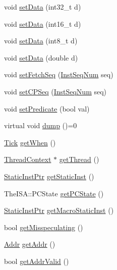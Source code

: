 \begin{DoxyCompactItemize}
\item 
void \hyperlink{classTrace_1_1InstRecord_a0a9235e734de679667de04c586e8f5b8}{setData} (int32\_\-t d)
\item 
void \hyperlink{classTrace_1_1InstRecord_ad6c5a6b94b9bcb41af8fbf69bd96dd75}{setData} (int16\_\-t d)
\item 
void \hyperlink{classTrace_1_1InstRecord_a0028137d8603f477e28f9869f9617937}{setData} (int8\_\-t d)
\item 
void \hyperlink{classTrace_1_1InstRecord_a2abd4d7259938c86cfd9bd95f55f1c9f}{setData} (double d)
\item 
void \hyperlink{classTrace_1_1InstRecord_a6a2a2c4c9142ba6924aff9399759ad32}{setFetchSeq} (\hyperlink{inst__seq_8hh_a258d93d98edaedee089435c19ea2ea2e}{InstSeqNum} seq)
\item 
void \hyperlink{classTrace_1_1InstRecord_a6509e37b7ec23ed19556f37f235d8590}{setCPSeq} (\hyperlink{inst__seq_8hh_a258d93d98edaedee089435c19ea2ea2e}{InstSeqNum} seq)
\item 
void \hyperlink{classTrace_1_1InstRecord_a137a8c6cced89c2ff8387900439436b4}{setPredicate} (bool val)
\item 
virtual void \hyperlink{classTrace_1_1InstRecord_abf1ad25f5e8a680b74ae28575b1f0539}{dump} ()=0
\item 
\hyperlink{base_2types_8hh_a5c8ed81b7d238c9083e1037ba6d61643}{Tick} \hyperlink{classTrace_1_1InstRecord_ad59bd82868f55bde1edb9cee2949d267}{getWhen} ()
\item 
\hyperlink{classThreadContext}{ThreadContext} $\ast$ \hyperlink{classTrace_1_1InstRecord_a811dcdeb8c7f7311f203ae83a0619a72}{getThread} ()
\item 
\hyperlink{classRefCountingPtr}{StaticInstPtr} \hyperlink{classTrace_1_1InstRecord_aa6c3d79c9aefcdce933e5fb3a075a2c8}{getStaticInst} ()
\item 
TheISA::PCState \hyperlink{classTrace_1_1InstRecord_aff4d31108c216c0c9f134e019d6e2174}{getPCState} ()
\item 
\hyperlink{classRefCountingPtr}{StaticInstPtr} \hyperlink{classTrace_1_1InstRecord_a083f29286a8611d917cadee93a84cb04}{getMacroStaticInst} ()
\item 
bool \hyperlink{classTrace_1_1InstRecord_a40be5892297a4e4a3056c358fd8d9a64}{getMisspeculating} ()
\item 
\hyperlink{base_2types_8hh_af1bb03d6a4ee096394a6749f0a169232}{Addr} \hyperlink{classTrace_1_1InstRecord_a1d42b3dcdfc5c82eba0a7151c6a7e2ff}{getAddr} ()
\item 
bool \hyperlink{classTrace_1_1InstRecord_a31f9ce8ecfb158b5b5d199d27a822dd6}{getAddrValid} ()

\end{DoxyCompactItemize}
